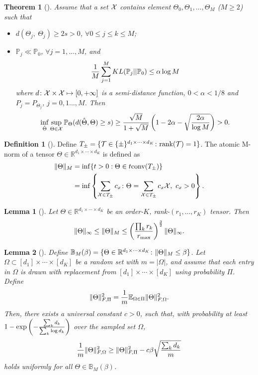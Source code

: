 \documentclass[11pt]{article}
\theoremstyle{plain}
\newtheorem{thm}{Theorem}[section]
\newtheorem{lem}{Lemma}
\theoremstyle{definition}
\newtheorem{defn}{Definition}
\begin{document}
\begin{thm}[\cite{tsybakov2009introduction}]\label{thm:Tsybakov} 
Assume that a set $\mathcal{X}$ contains element $\Theta_0, \Theta_1, \ldots,\Theta_M$ ($M\geq 2$) such that
\begin{itemize}
\item $d(\Theta_j,\ \Theta_j)\geq 2s>0$, $\forall 0\leq j\leq k\leq M$;
\item $\mathbb{P}_j\ll\mathbb{P}_0$, $\forall j=1,\ldots,M$, and 
\[
{1\over M}\sum_{j=1}^M KL(\mathbb{P}_j||\mathbb{P}_0)\leq \alpha \log M
\]
where $d\colon \mathcal{X}\times \mathcal{X}\mapsto [0,+\infty]$ is a semi-distance function, $0<\alpha<{1/8}$ and $P_j=P_{\Theta_j}$, $j=0,1\ldots,M$. Then
\[
\inf_{\hat \Theta}\sup_{\Theta\in\mathcal{X}} \mathbb{P}_{\Theta}(d(\hat \Theta, \Theta)\geq s)\geq {\sqrt{M}\over 1+\sqrt{M}}\left(1-2\alpha-\sqrt{2\alpha\over \log M} \right)>0.
\]
\end{itemize} 

\end{thm}
\begin{defn}[\cite{ghadermarzy2019near}] 
Define $T_{\pm}=\{\mathcal{T}\in\{\pm\}^{d_1\times \cdots \times d_K}\colon \text{rank}(\mathcal{T})=1\}$. The atomic M-norm of a tensor $\Theta\in\mathbb{R}^{d_1\times \cdots \times d_K}$ is defined as
\begin{align}
\lVert\Theta\rVert_M&=\inf\{t>0: \Theta\in t\text{conv}(T_{\pm})\}\\
&=\inf\left\{\sum_{\mathcal{X}\in T_{\pm}}c_x\colon \Theta=\sum_{\mathcal{X}\in T_{\pm}} c_x\mathcal{X}, \ c_x>0\right\}.
\end{align}
\end{defn}

\begin{lem}[\cite{ghadermarzy2019near}]\label{lem:Mnormbound}
Let $\Theta\in\mathbb{R}^{d_1\times \cdots \times d_K}$ be an order-$K$, rank-$(r_1,\ldots,r_K)$ tensor. Then
\[
\lVert\Theta\rVert_\infty\leq \lVert\Theta\rVert_M\leq \left(\prod_k r_k \over r_{\max}\right)^{3\over 2} \lVert\Theta\rVert_\infty.
\]
\end{lem}

\begin{lem}[\cite{ghadermarzy2019near}]\label{lem:convexity}
Define $\mathbb{B}_{M}(\beta)=\{\Theta\in \mathbb{R}^{d_1\times \cdots \times d_K}\colon \lVert\Theta\rVert_M\leq \beta \}$.  Let $\Omega\subset[d_1]\times\cdots \times [d_K]$ be a random set with $m=|\Omega|$, and assume that each entry in $\Omega$ is drawn with replacement from $[d_1]\times\cdots\times[d_K]$ using probability $\Pi$. Define
\[
\lVert\Theta\rVert_{F,\Pi}^2={1\over m}\mathbb{E}_{\Omega\in\Pi}\lVert\Theta\rVert_{F,\Omega}^2.
\]
Then, there exists a universal constant $c>0$, such that, with probability at least $1-\exp\left(-{\sum_kd_k \over \sum_k \log d_k} \right)$ over the sampled set $\Omega$, 
\[
{1\over m}\lVert\Theta\rVert_{F,\Omega}^2 \geq \lVert\Theta\rVert_{F,\Pi}^2-c\beta\sqrt{\sum_k d_k\over m}
\]
holds uniformly for all $\Theta\in\mathbb{B}_M(\beta)$. 
\end{lem}




\end{document}
